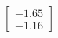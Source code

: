 \documentclass[preview]{standalone}
\begin{document}
\begin{align*}
\begin{bmatrix} -1.65 \\ -1.16 \end{bmatrix}
\end{align*}
\end{document}
